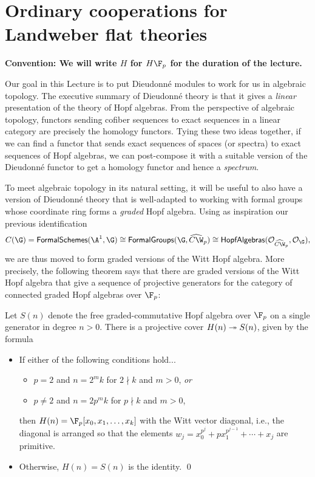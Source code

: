 \section{Ordinary cooperations for Landweber flat theories}\label{LEFTCooperations}

\begin{center}
\textbf{Convention: We will write $H$ for $H\F_p$ for the duration of the lecture.}
\end{center}

Our goal in this Lecture is to put Dieudonn\'e modules to work for us in algebraic topology.  The executive summary of Dieudonn\'e theory is that it gives a \emph{linear} presentation of the theory of Hopf algebras.  From the perspective of algebraic topology, functors sending cofiber sequences to exact sequences in a linear category are precisely the homology functors.  Tying these two ideas together, if we can find a functor that sends exact sequences of spaces (or spectra) to exact sequences of Hopf algebras, we can post-compose it with a suitable version of the Dieudonn\'e functor to get a homology functor and hence a \emph{spectrum}.

To meet algebraic topology in its natural setting, it will be useful to also have a version of Dieudonn\'e theory that is well-adapted to working with formal groups whose coordinate ring forms a \emph{graded} Hopf algebra.  Using as inspiration our previous identification \[C(\G) = \CatOf{FormalSchemes}(\A^1, \G) \cong \CatOf{FormalGroups}(\G, \widehat{C\W}_p) \cong \CatOf{HopfAlgebras}(\sheaf O_{\widehat{C\W}_p}, \sheaf O_{\G}),\] we are thus moved to form graded versions of the Witt Hopf algebra.  More precisely, the following theorem says that there are graded versions of the Witt Hopf algebra that give a sequence of projective generators for the category of connected graded Hopf algebras over $\F_p$:

\begin{theorem}
Let $S(n)$ denote the free graded-commutative Hopf algebra over $\F_p$ on a single generator in degree $n > 0$.  There is a projective cover $H(n) \twoheadrightarrow S(n)$, given by the formula
\begin{itemize}
\item If either of the following conditions hold...
\begin{itemize}
\item $p = 2$ and $n = 2^m k$ for $2 \nmid k$ and $m > 0$, \emph{or}
\item $p \ne 2$ and $n = 2p^m k$ for $p \nmid k$ and $m > 0$,
\end{itemize}
then $H(n) = \F_p[x_0, x_1, \ldots, x_k]$ with the Witt vector diagonal, i.e., the diagonal is arranged so that the elements $w_j = x_0^{p^j} + p x_1^{p^{j-1}} + \cdots + x_j$ are primitive.
\item Otherwise, $H(n) = S(n)$ is the identity.
\qed
\end{itemize}
\end{theorem}

